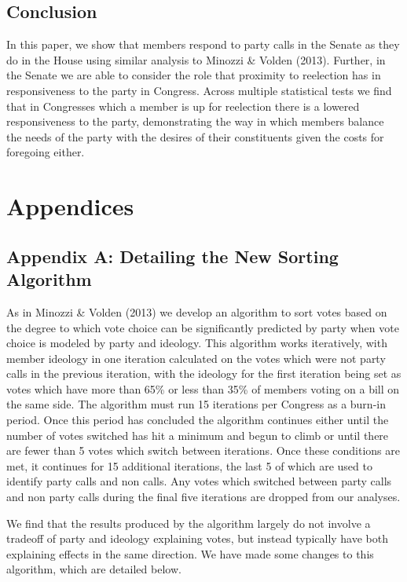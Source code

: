 \documentclass[12pt]{article}
\begin{document}
\subsection{Conclusion}

In this paper, we show that members respond to party calls in the Senate as they do in the House using similar analysis to Minozzi \& Volden (2013). Further, in the Senate we are able to consider the role that proximity to reelection has in responsiveness to the party in Congress. Across multiple statistical tests we find that in Congresses which a member is up for reelection there is a lowered responsiveness to the party, demonstrating the way in which members balance the needs of the party with the desires of their constituents given the costs for foregoing either.

\pagebreak

\section{Appendices}

\subsection{Appendix A: Detailing the New Sorting Algorithm}

As in Minozzi \& Volden (2013) we develop an algorithm to sort votes based on the degree to which vote choice can be significantly predicted by party when vote choice is modeled by party and ideology. This algorithm works iteratively, with member ideology in one iteration calculated on the votes which were not party calls in the previous iteration, with the ideology for the first iteration being set as votes which have more than 65\% or less than 35\% of members voting on a bill on the same side. The algorithm must run 15 iterations per Congress as a burn-in period. Once this period has concluded the algorithm continues either until the number of votes switched has hit a minimum and begun to climb or until there are fewer than 5 votes which switch between iterations. Once these conditions are met, it continues for 15 additional iterations, the last 5 of which are used to identify party calls and non calls. Any votes which switched between party calls and non party calls during the final five iterations are dropped from our analyses.

We find that the results produced by the algorithm largely do not involve a tradeoff of party and ideology explaining votes, but instead typically have both explaining effects in the same direction. We have made some changes to this algorithm, which are detailed below.
\end{document}
